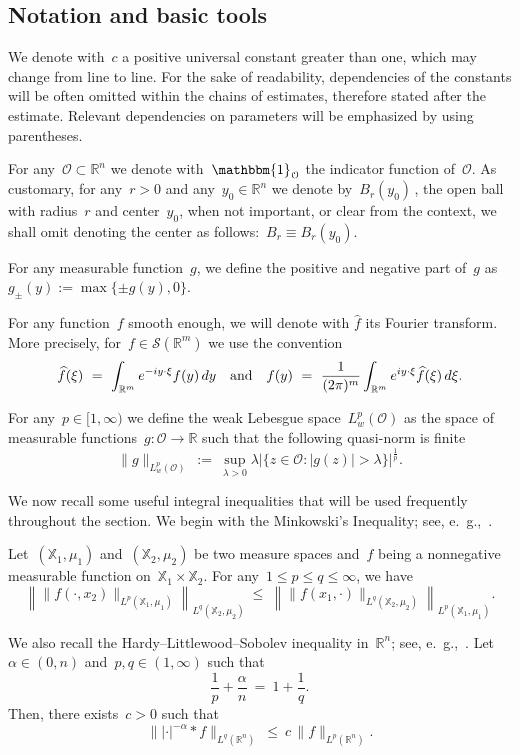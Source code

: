 \documentclass[leqno,10pt]{amsart}
\theoremstyle{plain}
\theoremstyle{remark}
\numberwithin{equation}{section}
\def \d{\,{\rm d}}
\def\er{\mathbb{R}}
\def\ern{\mathbb{R}^n}
\newcommand{\Oc}{\mathcal{O}}
\newcommand{\snr}[1]{\lvert #1\rvert}
\begin{document}
{\subsection{Notation and basic tools}
We denote with~$c$ a positive universal constant greater than one, which may change from line to line. For the sake of readability, dependencies of the constants will be often omitted within the chains of estimates, therefore stated after the estimate.
 Relevant dependencies on parameters will be emphasized by using parentheses.
 
 For any~$\Oc\subset \er^n$ we denote with~$\mathbbm{1}_{\Oc}$ the indicator function of~$\Oc$.
As customary, for any~$r>0$ and any~$y_{0} \in \er^n$ we denote by~$
B_r(y_{0})$\,,
the open ball with radius~$r$ and center~$y_{0}$, when not important, or clear from the context, we shall omit denoting the center as follows:~$B_r \equiv B_r(y_0)$.

For any measurable function~$g$, we define  the positive 
and negative part of~$g$ as~$g_\pm(y):=\max\{\pm g(y),0\}$. 

For any function~$f$ smooth enough, we will denote with $\hat{f}$ its Fourier transform.
More precisely, for~$f\in\mathcal S(\er^m)$ we use the convention
\[
\widehat f(\xi) \ = \ \int_{\er^m}e^{-iy\cdot\xi}f(y)\d y
\quad \text{and} \quad 
f(y)\ = \ \frac1{(2\pi)^m}\int_{\er^m}e^{iy\cdot\xi}\widehat f(\xi)\d\xi.
\]


For any~$p \in [1,\infty)$ we define the weak Lebesgue space~$L^{p}_w(\Oc)$ as the space of measurable functions~$g: \Oc \to \er$ such that the following quasi-norm is finite
\[
\|g\|_{L^{p}_w(\Oc)} \ := \ 
\sup_{\lambda>0}\lambda\snr{\{z \in \Oc: |g(z)|>\lambda\}}^\frac{1}{p}.
\] 

We now recall some useful integral inequalities that will be used frequently throughout the section. We begin with the Minkowski's Inequality; see, e.~\!g.,~\cite[Proposition~1.3]{BCD11}.

Let~$(\mathbb{X}_1,\mu_1)$ and~$(\mathbb{X}_2,\mu_2)$ be two measure spaces and~$f$ being a nonnegative measurable function on~$\mathbb{X}_1\times \mathbb{X}_2$. For any~$1 \leq p \leq q \leq \infty$, we have
\begin{equation}\label{eq:mink-ineq}
 \left\|\|f(\cdot,x_2)\|_{L^p(\mathbb{X}_1,\mu_1)}\right\|_{L^q(\mathbb{X}_2,\mu_2)} \ \leq \ \left\|\|f(x_1,\cdot)\|_{L^q(\mathbb{X}_2,\mu_2)}\right\|_{L^p(\mathbb{X}_1,\mu_1)}.
\end{equation}

We also recall the Hardy--Littlewood--Sobolev inequality in~$\er^n$; see, e.~\!g.,~\cite[Theorem~1.7]{BCD11}.
Let~$\alpha \in (0,n)$ and~$p,q \in (1,\infty)$ such that
\[
\frac{1}{p}+\frac{\alpha}{n}  \ = \ 1+ \frac{1}{q}.
\]
Then, there exists~$c>0$ such that
\begin{equation}\label{eq:hls-ineq}
\||\cdot|^{-\alpha}\ast f \|_{L^q(\ern)} \ \leq \ c\,\|f\|_{L^p(\ern)}.
\end{equation}


}
\end{document}
